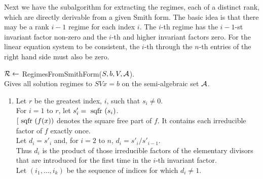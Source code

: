 \newpage
Next we have the subalgorithm for extracting the regimes, each of a distinct
rank, which are directly derivable from a given Smith form.
The basic idea is that there may be a rank $i-1$ regime for each index $i$.
The $i$-th regime has the $i-1$-st invariant factor non-zero and the $i$-th
and higher invariant factors zero.  
For the linear equation system to be consistent, 
the $i$-th through the $n$-th entries of the right hand side must also be zero. 

\begin{center}
${\cal R} \leftarrow$ RegimesFromSmithForm($S, b, V, {\cal A}$).\\
\bc Gives all solution regimes to $SVx = b$ on the semi-algebraic set ${\cal A}$.\ec
\end{center}
\begin{enumerate}
\item
Let $r$ be the greatest index, $i$, such that $s_i \neq 0$.\\ 
For $i = 1$ to $r$, let $s'_i = ~\mbox{sqfr}~(s_i)$.\\
$[~\mbox{sqfr}~(f(x))$ denotes the square free part of $f$.  It contains each 
irreducible factor of $f$ exactly once. \ec  \\
Let $d_i = s'_i$ and, for $i = 2$ to $n$, $d_i = s'_i/s'_{i-1}$.\\
\bc Thus $d_i$ is the product of those
irreducible factors of the elementary divisors that are introduced for 
the first time in the $i$-th invariant factor. \ec \\
Let $(i_1, \ldots, i_k)$ be the sequence of indices for which $d_i \neq 1$.


\end{enumerate}
